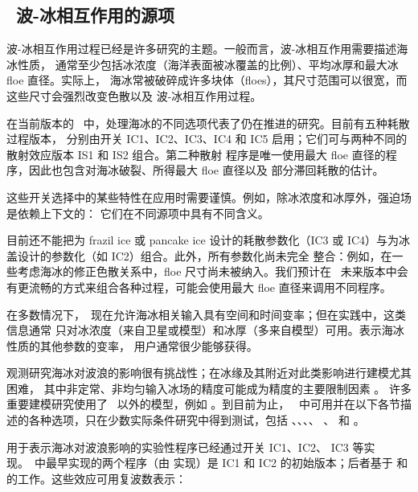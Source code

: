 \vssub
\subsection{~波-冰相互作用的源项}
\vsssub

波-冰相互作用过程已经是许多研究的主题。一般而言，波-冰相互作用需要描述海冰性质，
通常至少包括冰浓度（海洋表面被冰覆盖的比例）、平均冰厚和最大冰 floe 直径。实际上，
海冰常被破碎成许多块体（floes），其尺寸范围可以很宽，而这些尺寸会强烈改变色散以及
波-冰相互作用过程。

在当前版本的 \ww\ 中，处理海冰的不同选项代表了仍在推进的研究。目前有五种耗散过程版本，
分别由开关 {\code IC1}、{\code IC2}、{\code IC3}、{\code IC4} 和 {\code IC5}
启用；它们可与两种不同的散射效应版本 {\code IS1} 和 {\code IS2} 组合。第二种散射
程序是唯一使用最大 floe 直径的程序，因此也包含对海冰破裂、所得最大 floe 直径以及
部分滞回耗散的估计。

这些开关选择中的某些特性在应用时需要谨慎。例如，除冰浓度和冰厚外，强迫场是依赖上下文的：
它们在不同源项中具有不同含义。

目前还不能把为 frazil ice 或 pancake ice 设计的耗散参数化（{\code IC3} 或
{\code IC4}）与为冰盖设计的参数化（如 {\code IC2}）组合。此外，所有参数化尚未完全
整合：例如，在一些考虑海冰的修正色散关系中，floe 尺寸尚未被纳入。我们预计在 \ws\
未来版本中会有更流畅的方式来组合各种过程，可能会使用最大 floe 直径来调用不同程序。

在多数情况下，\ws\ 现在允许海冰相关输入具有空间和时间变率；但在实践中，这类信息通常
只对冰浓度（来自卫星或模型）和冰厚（多来自模型）可用。表示海冰性质的其他参数的变率，
用户通常很少能够获得。

观测研究海冰对波浪的影响很有挑战性；在冰缘及其附近对此类影响进行建模尤其困难，
其中非定常、非均匀输入冰场的精度可能成为精度的主要限制因素 \citep{rep:RPLA18}。
许多重要建模研究使用了 \ws\ 以外的模型，例如 \cite{art:DB13}。到目前为止，
\ws\ 中可用并在以下各节描述的各种选项，只在少数实际条件研究中得到测试，包括
\cite{art:LKS15}、\cite{art:Aea16}、\cite{art:WHR16}、\cite{art:RTS16}、
\cite{rep:RPLA18}、\cite{art:CRT17} 和 \cite{Liu2020}。


\noindent
用于表示海冰对波浪影响的实验性程序已经通过开关 {\code IC1}、{\code IC2}、
{\code IC3} 等实现。\ws\ 中最早实现的两个程序（由 \cite{rep:RO13} 实现）是
{\code IC1} 和 {\code IC2} 的初始版本；后者基于 \cite{art:LMC88} 和
\cite{art:LHV91} 的工作。这些效应可用复波数表示：

